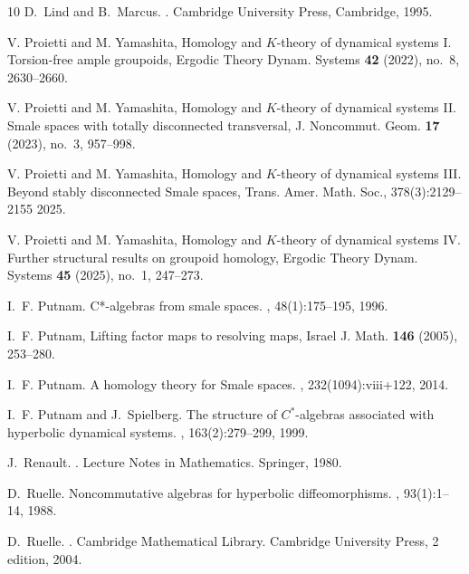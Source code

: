 \documentclass{amsart}
\theoremstyle{plain}
\theoremstyle{definition}
\theoremstyle{remark}
\begin{document}
\begin{thebibliography}{10}
D.~Lind and B.~Marcus.
.
\newblock Cambridge University Press, Cambridge, 1995.



V. Proietti and M. Yamashita, Homology and $K$-theory of dynamical systems I. Torsion-free ample groupoids, Ergodic Theory Dynam. Systems {\bf 42} (2022), no.~8, 2630--2660.

V. Proietti and M. Yamashita, Homology and $K$-theory of dynamical systems II. Smale spaces with totally disconnected transversal, J. Noncommut. Geom. {\bf 17} (2023), no.~3, 957--998.

V. Proietti and M. Yamashita, Homology and $K$-theory of dynamical systems  III. Beyond stably disconnected Smale spaces, Trans. Amer. Math. Soc., 378(3):2129--2155 2025.

V. Proietti and M. Yamashita, Homology and $K$-theory of dynamical systems IV. Further structural results on groupoid homology, Ergodic Theory Dynam. Systems {\bf 45} (2025), no.~1, 247--273.


I.~F. Putnam.
\newblock C*-algebras from smale spaces.
, 48(1):175–195, 1996.

I.~F. Putnam, Lifting factor maps to resolving maps, Israel J. Math. {\bf 146} (2005), 253--280.

I.~F. Putnam. A homology theory for {S}male spaces.
, 232(1094):viii+122, 2014.

I.~F. Putnam and J.~Spielberg.
\newblock The structure of {$C^\ast$}-algebras associated with hyperbolic
  dynamical systems.
, 163(2):279--299, 1999.

J.~Renault.
.
\newblock Lecture Notes in Mathematics. Springer, 1980.


D.~Ruelle.
\newblock Noncommutative algebras for hyperbolic diffeomorphisms.
, 93(1):1--14, 1988.

D.~Ruelle.
.
\newblock Cambridge Mathematical Library. Cambridge University Press, 2
  edition, 2004.


\end{thebibliography}
\end{document}
